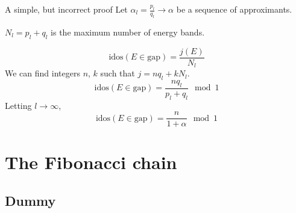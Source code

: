 \documentclass[xcolor=x11names,compress,professionalfonts]{beamer}
\renewcommand{\(}{\begin{columns}}
\renewcommand{\)}{\end{columns}}
\newcommand{\<}[1]{\begin{column}{#1}}
\renewcommand{\>}{\end{column}}
\newcommand{\id}{\ensuremath{\text{idos}}}
\begin{document}
\begin{frame}{A simple, but incorrect proof}
Let $\alpha_l = \frac{p_l}{q_l} \to \alpha$ be a sequence of approximants.

$N_l = p_l + q_l$ is the maximum number of energy bands.

\[
	\id(E \in \text{gap}) = \frac{j(E)}{N_l}
\]
We can find integers $n$, $k$ such that $j = n q_l + k N_l$.
\[
	\id(E \in \text{gap}) = \frac{n q_l}{p_l + q_l} \mod 1
\]
Letting $l \to \infty$,
	\[
		\id(E \in \text{gap}) = \frac{n}{1+\alpha} \mod 1
	\]

    

\end{frame}

\section{The Fibonacci chain}
\subsection{Dummy}
\end{document}
